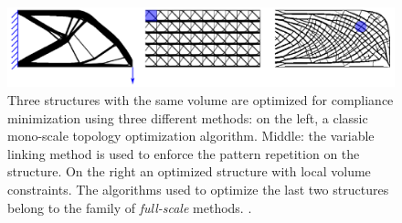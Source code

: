 \begin{figure}
    \centering
    \includegraphics[width=\linewidth]{figures/02_literature/full-to.png}
    \caption{Three structures with the same volume are optimized for compliance minimization using three different methods: on the left, a classic mono-scale topology optimization algorithm. Middle: the variable linking method is used to enforce the pattern repetition on the structure. On the right an optimized structure with local volume constraints. The algorithms used to optimize the last two structures belong to the family of \textit{full-scale} methods. \cite{wu_topology_2021}.}
    \label{fig:02_full-to}
\end{figure}